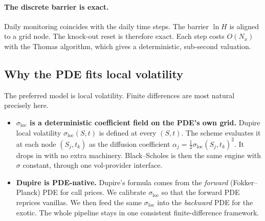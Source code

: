 \documentclass[11pt]{article}
\begin{document}
\paragraph{The discrete barrier is exact.} Daily monitoring coincides with the daily time steps.
The barrier $\ln H$ is aligned to a grid node. The knock-out reset is therefore exact. Each step
costs $O(N_x)$ with the Thomas algorithm, which gives a deterministic, sub-second valuation.

\subsection{Why the PDE fits local volatility}
The preferred model is local volatility. Finite differences are most natural precisely here.
\begin{itemize}[leftmargin=1.4em,itemsep=2pt]
  \item \textbf{$\sigma_{\mathrm{loc}}$ is a deterministic coefficient field on the PDE's own
  grid.} Dupire local volatility $\sigma_{\mathrm{loc}}(S,t)$ is defined at every $(S,t)$. The
  scheme evaluates it at each node $(S_j,t_k)$ as the diffusion coefficient
  $\alpha_j=\tfrac12\sigma_{\mathrm{loc}}(S_j,t_k)^2$. It drops in with no extra machinery.
  Black--Scholes is then the same engine with $\sigma$ constant, through one vol-provider interface.
  \item \textbf{Dupire is PDE-native.} Dupire's formula comes from the \emph{forward}
  (Fokker--Planck) PDE for call prices. We calibrate $\sigma_{\mathrm{loc}}$ so that the forward
  PDE reprices vanillas. We then feed the same $\sigma_{\mathrm{loc}}$ into the \emph{backward}
  PDE for the exotic. The whole pipeline stays in one consistent finite-difference framework.
\end{itemize}
\end{document}
